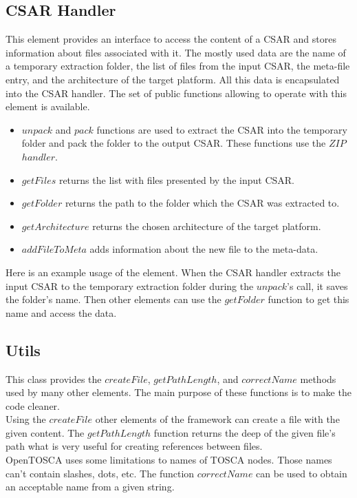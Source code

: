 \subsection*{CSAR Handler}
This element provides an interface to access the content of a CSAR and stores information about files associated with it.
The mostly used data are the name of a temporary extraction folder, the list of files from the input CSAR, the meta-file entry, and the architecture of the target platform.
All this data is encapsulated into the CSAR handler.
The set of public functions allowing to operate with this element is available.
\begin{itemize}
	\item $unpack$ and $pack$ functions are used to extract the CSAR into the temporary folder and pack the folder to the output CSAR. 
	These functions use the $ZIP$~$handler$.
	\item $getFiles$ returns the list with files presented by the input CSAR.
	\item $getFolder$ returns the path to the folder which the CSAR was extracted to.
	\item $getArchitecture$ returns the chosen architecture of the target platform.
	\item $addFileToMeta$ adds information about the new file to the meta-data.
\end{itemize}
Here is an example usage of the element.
When the CSAR handler extracts the input CSAR to the temporary extraction folder during the $unpack$'s call, it saves the folder's name. 
Then other elements can use the $getFolder$ function to get this name and access the data.

\subsection*{Utils}
This class provides the $createFile$, $getPathLength$, and $correctName$ methods used by many other elements.
The main purpose of these functions is to make the code cleaner. \\
Using the $createFile$ other elements of the framework can create a file with the given content.
The $getPathLength$ function returns the deep of the given file's path what is very useful for creating references between files.\\
OpenTOSCA uses some limitations to names of TOSCA nodes. 
Those names can't contain slashes, dots, etc.
The function $correctName$ can be used to obtain an acceptable name from a given string.

